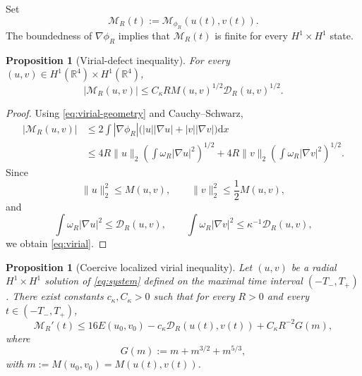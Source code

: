 \documentclass[10pt,a4paper]{amsart}
\numberwithin{equation}{section}
\newtheorem{proposition}[theorem]{Proposition}
\newcommand{\R}{\mathbb{R}}
\newcommand{\dd}{\mathrm{d}x}
\begin{document}
Set
\begin{equation*}
 \mathcal M_R(t):=\mathcal M_{\phi_R}(u(t),v(t)).
\end{equation*}
The boundedness of $\nabla\phi_R$ implies that $\mathcal M_R(t)$ is finite for every $H^1\times H^1$ state.

\begin{proposition}[Virial-defect inequality]\label{prop:virial}
For every $(u,v)\in H^1(\R^4)\times H^1(\R^4)$,
\begin{equation}\label{eq:virial}
 |\mathcal M_R(u,v)| \le C_\kappa RM(u,v)^{1/2}\mathcal D_R(u,v)^{1/2}.
\end{equation}
\end{proposition}

\begin{proof}
Using \eqref{eq:virial-geometry} and Cauchy--Schwarz,
\begin{align*}
 |\mathcal M_R(u,v)|
 &\le2\int|\nabla\phi_R|
 \big(|u||\nabla u|+|v||\nabla v|\big)\dd\\
 &\le4R\|u\|_2\left(\int\omega_R|\nabla u|^2\right)^{1/2}
 +4R\|v\|_2\left(\int\omega_R|\nabla v|^2\right)^{1/2}.
\end{align*}
Since
\[
 \|u\|_2^2\le M(u,v), \qquad \|v\|_2^2\le\frac12M(u,v),
\]
and
\[
 \int\omega_R|\nabla u|^2\le\mathcal D_R(u,v),
 \qquad
 \int\omega_R|\nabla v|^2\le\kappa^{-1}\mathcal D_R(u,v),
\]
we obtain \eqref{eq:virial}.
\end{proof}


\begin{proposition}[Coercive localized virial inequality]\label{prop:coercive}
Let $(u,v)$ be a radial $H^1\times H^1$ solution of \eqref{eq:system} defined on the maximal time interval $(-T_-,T_+)$. There exist constants $c_\kappa,C_\kappa>0$ such that for every $R>0$ and every $t\in (-T_-,T_+)$,
\begin{equation}\label{eq:coercive}
 \mathcal M_R'(t)
 \le16E(u_0,v_0)-c_\kappa\mathcal D_R(u(t),v(t)) +C_\kappa R^{-2}G(m),
\end{equation}
where
\begin{equation*}
 G(m):=m+m^{3/2}+m^{5/3},
\end{equation*}
with $m:=M(u_0,v_0)=M(u(t),v(t))$.
\end{proposition}
\end{document}
